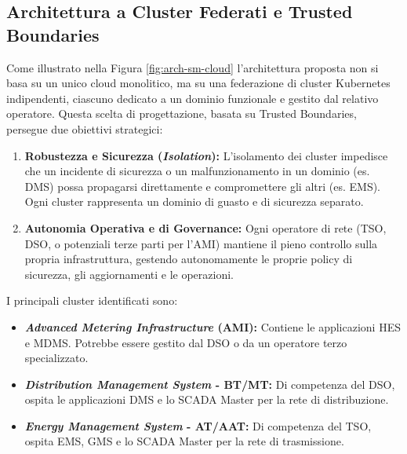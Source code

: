 \subsection{Architettura a Cluster Federati e Trusted Boundaries}





Come illustrato nella Figura \ref{fig:arch-sm-cloud} l'architettura proposta non si basa su un unico cloud monolitico, ma su una federazione di cluster Kubernetes indipendenti, ciascuno dedicato a un dominio funzionale e gestito dal relativo operatore. Questa scelta di progettazione, basata su Trusted Boundaries, persegue due obiettivi strategici:

\begin{enumerate}
    \item \textbf{Robustezza e Sicurezza (\textit{Isolation}):} L'isolamento dei cluster impedisce che un incidente di sicurezza o un malfunzionamento in un dominio (es. DMS) possa propagarsi direttamente e compromettere gli altri (es. EMS). Ogni cluster rappresenta un dominio di guasto e di sicurezza separato.
    \item \textbf{Autonomia Operativa e di Governance:} Ogni operatore di rete (TSO, DSO, o potenziali terze parti per l'AMI) mantiene il pieno controllo sulla propria infrastruttura, gestendo autonomamente le proprie policy di sicurezza, gli aggiornamenti e le operazioni.
\end{enumerate}


I principali cluster identificati sono:

\begin{itemize}
    \item \textbf{\textit{Advanced Metering Infrastructure} (AMI):} Contiene le applicazioni HES e MDMS. Potrebbe essere gestito dal DSO o da un operatore terzo specializzato.
    \item \textbf{\textit{Distribution Management System} - BT/MT:} Di competenza del DSO, ospita le applicazioni DMS e lo SCADA Master per la rete di distribuzione.
    \item \textbf{\textit{Energy Management System} - AT/AAT:} Di competenza del TSO, ospita EMS, GMS e lo SCADA Master per la rete di trasmissione.
\end{itemize}

